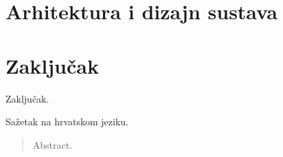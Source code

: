 \documentclass[times, utf8, zavrsni]{fer}
\begin{document}
\chapter{Arhitektura i dizajn sustava}

\chapter{Zaključak}
Zaključak.




\begin{sazetak}
Sažetak na hrvatskom jeziku.

\end{sazetak}

\begin{abstract}
Abstract.

\end{abstract}
\end{document}
